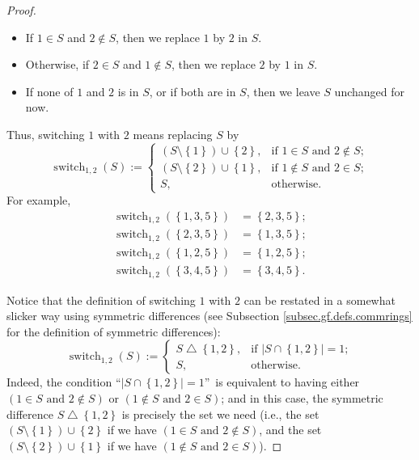 \begin{proof}
\begin{itemize}
\item If $1\in S$ and $2\notin S$, then we replace $1$ by $2$ in $S$.

\item Otherwise, if $2\in S$ and $1\notin S$, then we replace $2$ by $1$ in
$S$.

\item If none of $1$ and $2$ is in $S$, or if both are in $S$, then we leave
$S$ unchanged for now.
\end{itemize}

\noindent Thus, switching $1$ with $2$ means replacing $S$ by%
\[
\operatorname*{switch}\nolimits_{1,2}\left(  S\right)  :=%
\begin{cases}
\left(  S\setminus\left\{  1\right\}  \right)  \cup\left\{  2\right\}  , &
\text{if }1\in S\text{ and }2\notin S;\\
\left(  S\setminus\left\{  2\right\}  \right)  \cup\left\{  1\right\}  , &
\text{if }1\notin S\text{ and }2\in S;\\
S, & \text{otherwise.}%
\end{cases}
\]
For example,%
\begin{align*}
\operatorname*{switch}\nolimits_{1,2}\left(  \left\{  1,3,5\right\}  \right)
&  =\left\{  2,3,5\right\}  ;\\
\operatorname*{switch}\nolimits_{1,2}\left(  \left\{  2,3,5\right\}  \right)
&  =\left\{  1,3,5\right\}  ;\\
\operatorname*{switch}\nolimits_{1,2}\left(  \left\{  1,2,5\right\}  \right)
&  =\left\{  1,2,5\right\}  ;\\
\operatorname*{switch}\nolimits_{1,2}\left(  \left\{  3,4,5\right\}  \right)
&  =\left\{  3,4,5\right\}  .
\end{align*}


Notice that the definition of switching $1$ with $2$ can be restated in a
somewhat slicker way using symmetric differences (see Subsection
\ref{subsec.gf.defs.commrings} for the definition of symmetric differences):%
\[
\operatorname*{switch}\nolimits_{1,2}\left(  S\right)  :=%
\begin{cases}
S\bigtriangleup\left\{  1,2\right\}  , & \text{if }\left\vert S\cap\left\{
1,2\right\}  \right\vert =1;\\
S, & \text{otherwise.}%
\end{cases}
\]
Indeed, the condition \textquotedblleft$\left\vert S\cap\left\{  1,2\right\}
\right\vert =1$\textquotedblright\ is equivalent to having either $\left(
1\in S\text{ and }2\notin S\right)  $ or $\left(  1\notin S\text{ and }2\in
S\right)  $; and in this case, the symmetric difference $S\bigtriangleup
\left\{  1,2\right\}  $ is precisely the set we need (i.e., the set $\left(
S\setminus\left\{  1\right\}  \right)  \cup\left\{  2\right\}  $ if we have
$\left(  1\in S\text{ and }2\notin S\right)  $, and the set $\left(
S\setminus\left\{  2\right\}  \right)  \cup\left\{  1\right\}  $ if we have
$\left(  1\notin S\text{ and }2\in S\right)  $).


\end{proof}

